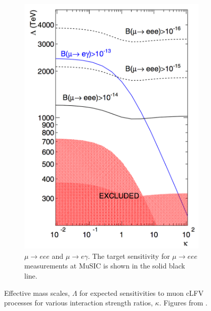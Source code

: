 \begin{figure}[htbp]
\begin{subfigure}[t]{0.49\textwidth}
      \includegraphics[width=\textwidth]{images/clfv_type2.png}
      \caption{\( \mu\rightarrow eee \) and \( \mu\rightarrow e\gamma \). The target sensitivity for \( \mu\rightarrow eee \) measurements at MuSIC is shown in the solid black line.}
    \end{subfigure}
    \caption{Effective mass scales, \(\Lambda\) for expected sensitivities to muon cLFV processes for various interaction strength ratios, \(\kappa\). Figures from \cite{effective_lagrangian_for_clfv}.}
  \label{fig:images_clfv_type2}
\end{figure}

